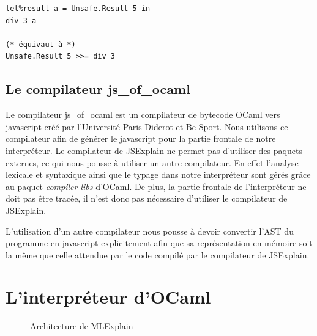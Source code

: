\documentclass{easychair}
\begin{document}
\begin{verbatim}
let%result a = Unsafe.Result 5 in
div 3 a

(* équivaut à *)
Unsafe.Result 5 >>= div 3
\end{verbatim}	

\subsection{Le compilateur js\_of\_ocaml}
Le compilateur js\_of\_ocaml est un compilateur de bytecode OCaml vers 
javascript créé par l'Université Paris-Diderot et Be Sport. Nous utilisons ce 
compilateur afin de générer le javascript pour la partie frontale de notre 
interpréteur. Le compilateur de JSExplain ne permet pas d'utiliser des paquets 
externes, ce qui nous pousse à utiliser un autre compilateur. En effet l'analyse 
lexicale et syntaxique ainsi que le typage dans notre interpréteur sont gérés 
grâce au paquet \emph{compiler-libs} d'OCaml. De plus, la partie frontale de 
l'interpréteur ne doit pas être tracée, il n'est donc pas nécessaire d'utiliser 
le compilateur de JSExplain.

L'utilisation d'un autre compilateur nous pousse à devoir convertir l'AST du 
programme en javascript explicitement afin que sa représentation en mémoire 
soit la même que celle attendue par le code compilé par le compilateur de 
JSExplain.

\section{L'interpréteur d'OCaml}

\begin{figure}[ht]
  
  \caption{Architecture de MLExplain}
  \label{arch_mlexplain}
\end{figure}
\end{document}
